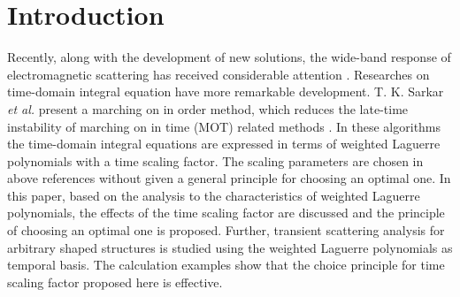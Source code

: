 \documentclass[conference, a4paper]{IEEEtran}
\begin{document}
%
\IEEEpeerreviewmaketitle



\section{Introduction}
Recently, along with the development of new solutions, the wide-band response of
electromagnetic scattering has received considerable attention
\cite{kashyap:stabilizing:1998,hujinlin:temporal:2001,jung:cfie:2002,jizhong:solving:2006}.
Researches
on time-domain integral equation have more remarkable development. T. K.
Sarkar {\em et al.} present a marching on in order method, which
reduces the late-time instability of marching on in time (MOT) related
methods \cite{jizhong:solving:2006,jung:accurate:2002,jung:analysis:2004,jung:time:2003}. In these algorithms the time-domain integral equations
are expressed in terms of weighted Laguerre polynomials with a time
scaling factor. The scaling parameters are chosen in above references
without given a general principle for choosing an optimal one. In this
paper, based on the analysis to the characteristics of weighted Laguerre
polynomials, the effects of the time scaling factor are discussed and the
principle of choosing an optimal one is proposed. Further, transient scattering analysis for arbitrary shaped structures is studied using the 
weighted Laguerre polynomials as temporal basis. The calculation examples show that the choice
principle for time scaling factor proposed here is effective.
 

%
\end{document}
